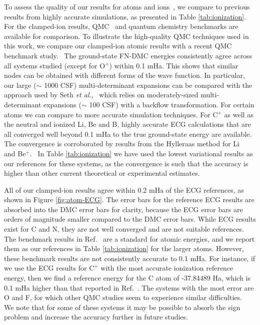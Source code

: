 To assess the quality of our results for atoms and ions~\cite{masses}, we compare to previous results from highly accurate simulations, as presented in Table \ref{tab:ionization}. For the clamped-ion results, QMC~\cite{Brown_Bench,Toulouse_Bench,Seth_Bench,Morale_Bench,Rappe_Bench} and quantum chemistry benchmarks are available for comparison. To illustrate the high-quality QMC techniques used in this work, we compare our clamped-ion atomic results with a recent QMC benchmark study.~\cite{Seth_Bench} The ground-state FN-DMC energies consistently agree across all systems studied (except for O$^{+}$) within 0.1 mHa. This shows that similar nodes can be obtained with different forms of the wave function. In particular, our large ($\sim$ 1000 CSF) multi-determinant expansions can be compared with the approach used by Seth {\it et al.},~\cite{Seth_Bench} which relies on moderately-sized multi-determinant expansions ($\sim$ 100 CSF) with a backflow transformation. For certain atoms we can compare to more accurate simulation techniques. For C$^+$ as well as the neutral and ionized Li, Be and B, highly accurate ECG calculations that are all converged well beyond 0.1 mHa to the true ground-state energy are available. The convergence is corroborated by results from the Hylleraas method for Li~\cite{Wang_Li} and Be$^+$.~\cite{Puchalski_Be+} In Table \ref{tab:ionization} we have used the lowest variational results as our references for these systems, as the convergence is such that the accuracy is higher than other current theoretical or experimental estimates. 

All of our clamped-ion results agree within 0.2 mHa of the ECG references, as shown in Figure \ref{fig:atom-ECG}. The error bars for the reference ECG results are absorbed into the DMC error bars for clarity, because the ECG error bars are orders of magnitude smaller compared to the DMC error bars. While ECG results exist for C and N, they are not well converged and are not suitable references.~\cite{Bubin_C,Sharkey_N} The benchmark results in Ref.~\cite{Davidson_Atoms} are a standard for atomic energies, and we report them as our references in Table \ref{tab:ionization} for the larger atoms. However, these benchmark results are not consistently accurate to 0.1 mHa. For instance, if we use the ECG results for $\text{C}^+$ with the most accurate ionization reference energy, then we find a reference energy for the C atom of -37.84489 Ha, which is 0.1 mHa higher than that reported in Ref.~\cite{Davidson_Atoms}. %
The systems with the most error are O and F, for which other QMC studies seem to experience similar difficulties.~\cite{Seth_Bench,Booth_FCIQMC,Brown_Bench,Shiwei_AFQMC} We note that for some of these systems it may be possible to absorb the sign problem and increase the accuracy further in future studies.~\cite{Tubman_Release,Tubman_ACS} %

